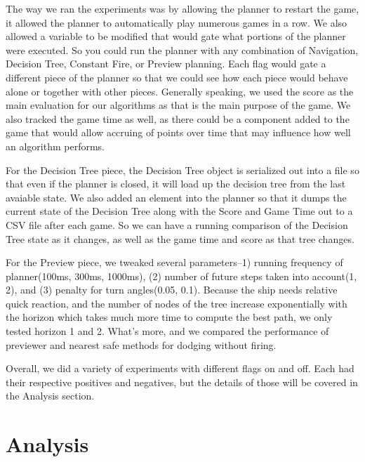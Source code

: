 \documentclass[10pt,final,conference]{IEEEtran}
\begin{document}
The way we ran the experiments was by allowing the planner to restart the game, it allowed the planner to automatically play numerous games in a row.  We also allowed a variable to be modified that would gate what portions of the planner were executed.  So you could run the planner with any combination of Navigation, Decision Tree, Constant Fire, or Preview planning.  Each flag would gate a different piece of the planner so that we could see how each piece would behave alone or together with other pieces.  Generally speaking, we used the score as the main evaluation for our algorithms as that is the main purpose of the game.  We also tracked the game time as well, as there could be a component added to the game that would allow accruing of points over time that may influence how well an algorithm performs.

For the Decision Tree piece, the Decision Tree object is serialized out into a file so that even if the planner is closed, it will load up the decision tree from the last avaiable state.  We also added an element into the planner so that it dumps the current state of the Decision Tree along with the Score and Game Time out to a CSV file after each game.  So we can have a running comparison of the Decision Tree state as it changes, as well as the game time and score as that tree changes.

For the Preview piece, we tweaked several parameters--1) running frequency of planner(100ms, 300ms, 1000ms), (2) number of future steps taken into account(1, 2), and (3) penalty for turn angles(0.05, 0.1). Because the ship needs relative quick reaction, and the number of nodes of the tree increase exponentially with the horizon which takes much more time to compute the best path, we only tested horizon 1 and 2. What's more, and we compared the performance of previewer and nearest safe methods for dodging without firing.

Overall, we did a variety of experiments with different flags on and off.  Each had their respective positives and negatives, but the details of those will be covered in the Analysis section.

\section{Analysis}
\end{document}
